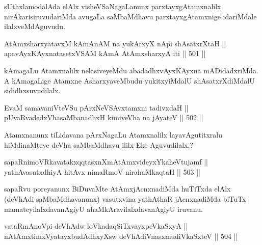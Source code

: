 \begin{artha}
sUthxlamodalAda elAlx visheVSaNagaLanunx parxtayxgAtamxnalilx
nirAkarisiruvudariMda avugaLa saMbaMdhavu parxtayxgAtamxnige
idariMdale ilalxveMdAguvudu.
\end{artha}


\begin{shl}
AtAmxsharxyatavxM kAmAnAM na yukAtxyX nApi shAsatxrXtaH || \\
apavAyxKAyxnatasetxVSAM kAmA AtAmxsharxyA iti \hfill || 501 ||  
\end{shl}

\begin{artha}
kAmagaLu Atamxnalilx nelasiveyeMdu abadadhxvAyxKAyxna mADidadxriMda. A
kAmagaLige Atamxne AsharxyaveMbudu yukitxyiMdalU shAsatxrXdiMdalU sididhxsuvudilalx.
\end{artha}


\begin{shl}
EvaM samavaniVteVSu pArxNeVSAvxtamxni tadivxdaH ||  \\
pUvaRvadedxVhasaMbanadhxH kimiveVha na jAyateV \hfill || 502 ||  
\end{shl}

\begin{artha}
Atamxnanunx tiLidavana pArxNagaLu Atamxnalilx layavAgutitxralu
hiMdinaMteye deVha saMbaMdhavu ililx Eke Aguvudilalx.?
\end{artha}


\begin{shl}
sapaRnimoVRkavatakxqqtasxnXmAtAmxvideyxYkaheVtujamf || \\
yathAvasutxdhiyA hitAvx nimaRmoV nirahaMkaqtaH \hfill || 503 ||  
\end{shl}

\begin{artha}
sapaRvu poreyanunx BiDuvaMte AtAmxjAcnxnadiMda huTiTxda elAlx (deVhAdi saMbaMdhavanunx) vasutxvina yathAthaR jAcnxnadiMda biTuTx mamateyilalxdavanAgiyU ahaMkAravilalxdavanAgiyU iruvanu.
\end{artha}


\begin{shl}
vataRmAnoV\s pi deVhAdw loVkadaqSiTxvayxpeVkaSxyA ||  \\
nA\s \s tAmx\s \s timxVyatavxbudAdhxyX\s sw deVhAdiVnasxmudiVkaSxteV \hfill || 504 || 
\end{shl}

